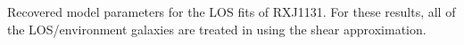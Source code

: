 \label{fig:los_triangle} Recovered model parameters for the LOS fits of RXJ1131. For these results, all of the LOS/environment galaxies are treated in using the shear approximation.